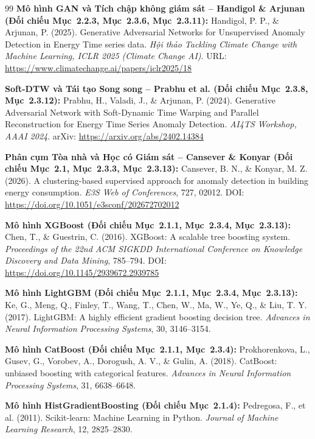 \begin{thebibliography}{99}
     \textbf{Mô hình GAN và Tích chập không giám sát -- Handigol \& Arjunan (Đối chiếu Mục~2.2.3, Mục~2.3.6, Mục~2.3.11):} Handigol, P. P., \& Arjunan, P. (2025). Generative Adversarial Networks for Unsupervised Anomaly Detection in Energy Time series data. \textit{Hội thảo Tackling Climate Change with Machine Learning, ICLR 2025 (Climate Change AI)}. URL: \url{https://www.climatechange.ai/papers/iclr2025/18}
    
     \textbf{Soft-DTW và Tái tạo Song song -- Prabhu et al. (Đối chiếu Mục~2.3.8, Mục~2.3.12):} Prabhu, H., Valadi, J., \& Arjunan, P. (2024). Generative Adversarial Network with Soft-Dynamic Time Warping and Parallel Reconstruction for Energy Time Series Anomaly Detection. \textit{AI4TS Workshop, AAAI 2024}. arXiv: \url{https://arxiv.org/abs/2402.14384}
    
     \textbf{Phân cụm Tòa nhà và Học có Giám sát -- Cansever \& Konyar (Đối chiếu Mục~2.1, Mục~2.3.3, Mục~2.3.13):} Cansever, B. N., \& Konyar, M. Z. (2026). A clustering-based supervised approach for anomaly detection in building energy consumption. \textit{E3S Web of Conferences}, 727, 02012. DOI: \url{https://doi.org/10.1051/e3sconf/202672702012}

     \textbf{Mô hình XGBoost (Đối chiếu Mục~2.1.1, Mục~2.3.4, Mục~2.3.13):} Chen, T., \& Guestrin, C. (2016). XGBoost: A scalable tree boosting system. \textit{Proceedings of the 22nd ACM SIGKDD International Conference on Knowledge Discovery and Data Mining}, 785--794. DOI: \url{https://doi.org/10.1145/2939672.2939785}
    
     \textbf{Mô hình LightGBM (Đối chiếu Mục~2.1.1, Mục~2.3.4, Mục~2.3.13):} Ke, G., Meng, Q., Finley, T., Wang, T., Chen, W., Ma, W., Ye, Q., \& Liu, T. Y. (2017). LightGBM: A highly efficient gradient boosting decision tree. \textit{Advances in Neural Information Processing Systems}, 30, 3146--3154.
    
     \textbf{Mô hình CatBoost (Đối chiếu Mục~2.1.1, Mục~2.3.4):} Prokhorenkova, L., Gusev, G., Vorobev, A., Dorogush, A. V., \& Gulin, A. (2018). CatBoost: unbiased boosting with categorical features. \textit{Advances in Neural Information Processing Systems}, 31, 6638--6648.
    
     \textbf{Mô hình HistGradientBoosting (Đối chiếu Mục~2.1.4):} Pedregosa, F., et al. (2011). Scikit-learn: Machine Learning in Python. \textit{Journal of Machine Learning Research}, 12, 2825--2830.
    

\end{thebibliography}
